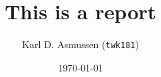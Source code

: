 
\author{Karl D. Asmussen (\texttt{twk181})}

\title{This is a report}

\date{\isodate\isodash{--}\today}


